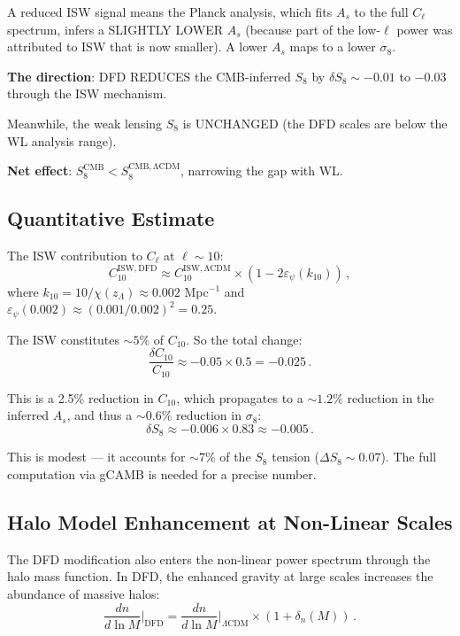 \documentclass[11pt,a4paper]{article}
\begin{document}
A reduced ISW signal means the Planck analysis, which fits $A_s$ to the full $C_\ell$ spectrum, infers a SLIGHTLY LOWER $A_s$ (because part of the low-$\ell$ power was attributed to ISW that is now smaller). A lower $A_s$ maps to a lower $\sigma_8$.

\textbf{The direction}: DFD REDUCES the CMB-inferred $S_8$ by $\delta S_8 \sim -0.01$ to $-0.03$ through the ISW mechanism.

Meanwhile, the weak lensing $S_8$ is UNCHANGED (the DFD scales are below the WL analysis range).

\textbf{Net effect}: $S_8^{\mathrm{CMB}} < S_8^{\mathrm{CMB,\Lambda CDM}}$, narrowing the gap with WL.

\subsection{Quantitative Estimate}

The ISW contribution to $C_\ell$ at $\ell \sim 10$:
\begin{equation}
C_{10}^{\mathrm{ISW,DFD}} \approx C_{10}^{\mathrm{ISW,\Lambda CDM}} \times (1 - 2\varepsilon_\psi(k_{10}))\,,
\end{equation}
where $k_{10} = 10/\chi(z_{\Lambda}) \approx 0.002$ Mpc$^{-1}$ and $\varepsilon_\psi(0.002) \approx (0.001/0.002)^2 = 0.25$.

The ISW constitutes $\sim 5\%$ of $C_{10}$. So the total change:
\begin{equation}
\frac{\delta C_{10}}{C_{10}} \approx -0.05 \times 0.5 = -0.025\,.
\end{equation}

This is a 2.5\% reduction in $C_{10}$, which propagates to a $\sim 1.2\%$ reduction in the inferred $A_s$, and thus a $\sim 0.6\%$ reduction in $\sigma_8$:
\begin{equation}
\delta S_8 \approx -0.006 \times 0.83 \approx -0.005\,.
\end{equation}

This is modest --- it accounts for $\sim 7\%$ of the $S_8$ tension ($\Delta S_8 \sim 0.07$). The full computation via gCAMB is needed for a precise number.

\subsection{Halo Model Enhancement at Non-Linear Scales}

The DFD modification also enters the non-linear power spectrum through the halo mass function. In DFD, the enhanced gravity at large scales increases the abundance of massive halos:
\begin{equation}
\frac{dn}{d\ln M}\bigg|_{\mathrm{DFD}} = \frac{dn}{d\ln M}\bigg|_{\Lambda\mathrm{CDM}} \times \left(1 + \delta_n(M)\right)\,.
\end{equation}
\end{document}
